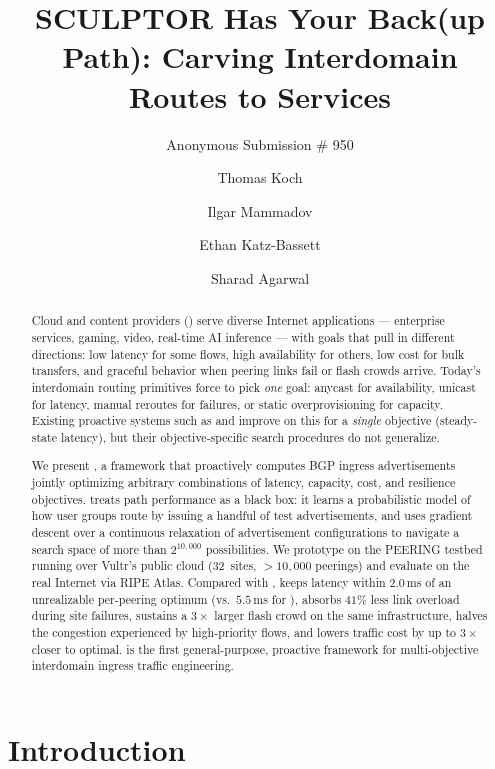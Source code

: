 \documentclass[acmsmall,anonymous,review,nonacm,10pt]{acmart}
\title{SCULPTOR Has Your Back(up Path): Carving Interdomain
       Routes to Services}
\author{Anonymous Submission \# 950}
\affiliation{\institution{}\country{}}
\author{Thomas Koch}
\affiliation{\institution{Columbia University}\country{USA}}
\author{Ilgar Mammadov}
\affiliation{\institution{Columbia University}\country{USA}}
\author{Ethan Katz-Bassett}
\affiliation{\institution{Columbia University}\country{USA}}
\author{Sharad Agarwal}
\affiliation{\institution{Microsoft}\country{USA}}
\begin{document}
\begin{abstract}
Cloud and content providers (\servprods) serve diverse Internet
applications --- enterprise services, gaming, video, real-time
AI inference --- with goals that pull in different directions:
low latency for some flows, high availability for others, low cost
for bulk transfers, and graceful behavior when peering links fail
or flash crowds arrive.  Today's interdomain routing primitives
force \servprods to pick \emph{one} goal: anycast for availability,
unicast for latency, manual reroutes for failures, or static
overprovisioning for capacity.  Existing proactive systems such
as \painter and \anyopt improve on this for a \emph{single}
objective (steady-state latency), but their objective-specific
search procedures do not generalize.

We present \sparse, a framework that proactively computes BGP
ingress advertisements jointly optimizing arbitrary combinations
of latency, capacity, cost, and resilience objectives.  \sparse
treats path performance as a black box: it learns a probabilistic
model of how user groups route by issuing a handful of test
advertisements, and uses gradient descent over a continuous
relaxation of advertisement configurations to navigate a search
space of more than $2^{10{,}000}$ possibilities.  We prototype
\sparse on the PEERING testbed running over Vultr's public cloud
(32~sites, ${>}10{,}000$ peerings) and evaluate on the real
Internet via RIPE Atlas.  Compared with \painter, \sparse keeps
latency within $2.0$\,ms of an unrealizable per-peering optimum
(vs.\ $5.5$\,ms for \painter), absorbs $41\%$ less link overload
during site failures, sustains a $3\times$ larger flash crowd on
the same infrastructure, halves the congestion experienced by
high-priority flows, and lowers traffic cost by up to
$3\times$ closer to optimal.  \sparse is the first general-purpose,
proactive framework for multi-objective interdomain ingress
traffic engineering.
\end{abstract}

\maketitle

\section{Introduction}
\label{sec:intro}
\end{document}
